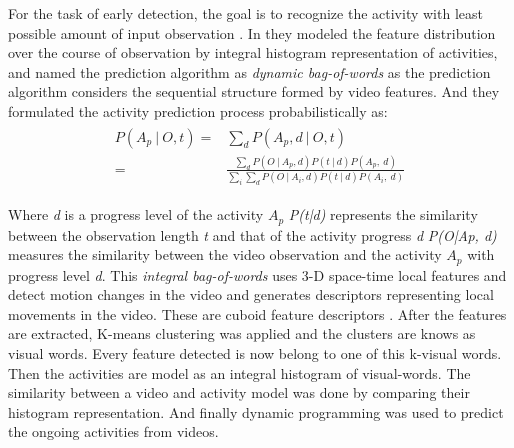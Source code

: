 For the task of early detection, the goal is to recognize the activity with least possible amount of input observation \cite{ryoo2011human}. In \cite{ryoo2011human} they modeled the feature distribution over the course of observation by integral histogram representation of activities, and named the prediction algorithm as \textit{dynamic bag-of-words} as the prediction algorithm considers the sequential structure formed by video features. And they formulated the activity prediction process probabilistically as:
\begin{align}
\begin{split}
		P(A_{p}\: |\: O,t) ={}& \displaystyle \sum_{d}  P(A_{p},d\: |\: O,t)\\
		={}&	\frac{\sum_{d} P(O\: | \: A_{p},d)P(t\: | \:d)P(A_{p},\: d)}
	 {\sum_{i}\sum_{d} P(O\: | \: A_{i},d)P(t\: | \:d)P(A_{i},\: d) }
\end{split}
\end{align}

Where \textit{d} is a progress level of the activity \textit{$A_{p}$}  \textit{ P(t|d)} represents the similarity between the observation length \textit{t} and that of the activity progress \textit{d}
\textit{P(O|Ap, d)} measures the similarity between the video observation and the activity \textit{$A_{p}$} with progress level \textit{d}. This \textit{integral bag-of-words } uses 3-D space-time local features and detect motion changes in the video and generates descriptors representing local movements in the video. These are cuboid feature descriptors \cite{dollar2005behavior}. After the features are extracted, K-means clustering was applied and the clusters are knows as visual words. Every feature detected is now belong to one of this k-visual words. Then the activities are model as an integral histogram of visual-words. The similarity between a video and activity model was done by comparing their histogram representation. And finally dynamic programming was used to predict the ongoing activities from videos.

